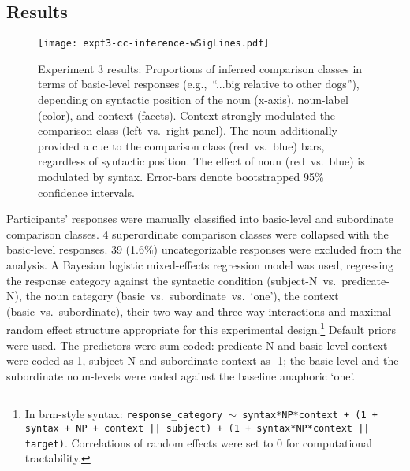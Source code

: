 \subsection{Results}
\label{cci-results-text}
\begin{figure*}[t]
	\begin{center}
		\texttt{[image: expt3-cc-inference-wSigLines.pdf]}
	\end{center}
	\vspace{-0.3cm}
	\caption{Experiment 3 results: Proportions of inferred comparison classes in terms of basic-level responses (e.g.,~“...big relative to other dogs”), depending on syntactic position of the noun (x-axis), noun-label (color), and context (facets).
		Context strongly modulated the comparison class (left~vs.~right panel). 
		The noun additionally provided a cue to the comparison class (red~vs.~blue) bars, regardless of syntactic position. 
		The effect of noun (red~vs.~blue) is modulated by syntax. 
		Error-bars denote bootstrapped 95\% confidence intervals.}
	\label{cci-results}
\end{figure*}
Participants’ responses were manually classified into basic-level and subordinate comparison classes. 4 superordinate comparison classes were collapsed with the basic-level responses. 39 (1.6\%) uncategorizable responses were excluded from the analysis. 
A Bayesian logistic mixed-effects regression model was used, regressing the response category against the syntactic condition (subject-N~vs.~predicate-N), the noun category (basic~vs.~subordinate~vs.~‘one’), the context (basic~vs.~subordinate), their two-way and three-way interactions and maximal random effect structure appropriate for this experimental design.\footnote{In brm-style syntax: \texttt{response\_category $\sim$ syntax*NP*context + (1 + syntax + NP + context || subject) + (1 + syntax*NP*context || target)}. Correlations of random effects were set to 0 for computational tractability.} Default priors were used.
The predictors were sum-coded: predicate-N and basic-level context were coded as 1, subject-N and subordinate context as -1; the basic-level and the subordinate noun-levels were coded against the baseline anaphoric `one'. 

